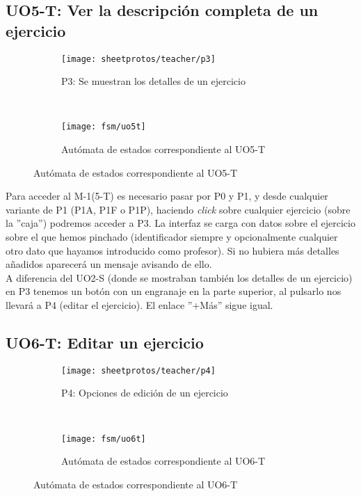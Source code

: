 \subsection{UO5-T: Ver la descripción completa de un ejercicio}
\label{analisis-de-requisitos:funcionales:uo5t}

\begin{figure}[H]
\begin{subfigure}[b]{\textwidth}
	\centering
	\texttt{[image: sheetprotos/teacher/p3]}
	\caption{P3: Se muestran los detalles de un ejercicio}
	\label{fig:analisis-de-requisitos:funcionales:uo5t:p3}
\end{subfigure}
\\
\begin{subfigure}[b]{\textwidth}
	\centering
	\texttt{[image: fsm/uo5t]}
	\caption{Autómata de estados correspondiente al UO5-T}
	\label{fig:analisis-de-requisitos:funcionales:uo5t:fsm}
\end{subfigure}
\end{figure}

Para acceder al M-1(5-T) es necesario pasar por P0 y P1, y desde cualquier variante de P1 (P1A, P1F o P1P), haciendo \textit{click} sobre cualquier ejercicio (sobre la ''caja'') podremos acceder a P3. La interfaz se carga con datos sobre el ejercicio sobre el que hemos pinchado (identificador siempre y opcionalmente cualquier otro dato que hayamos introducido como profesor). Si no hubiera más detalles añadidos aparecerá un mensaje avisando de ello.\\

A diferencia del UO2-S (donde se mostraban también los detalles de un ejercicio) en P3 tenemos un botón con un engranaje en la parte superior, al pulsarlo nos llevará a P4 (editar el ejercicio). El enlace ''+Más'' sigue igual.\\

\subsection{UO6-T: Editar un ejercicio}
\label{analisis-de-requisitos:funcionales:uo6t}

\begin{figure}[H]
\begin{subfigure}[b]{\textwidth}
	\centering
	\texttt{[image: sheetprotos/teacher/p4]}
	\caption{P4: Opciones de edición de un ejercicio}
	\label{fig:analisis-de-requisitos:funcionales:uo6t:p4}
\end{subfigure}
\\
\begin{subfigure}[b]{\textwidth}
	\centering
	\texttt{[image: fsm/uo6t]}
	\caption{Autómata de estados correspondiente al UO6-T}
	\label{fig:analisis-de-requisitos:funcionales:uo6t:fsm}
\end{subfigure}
\end{figure}

